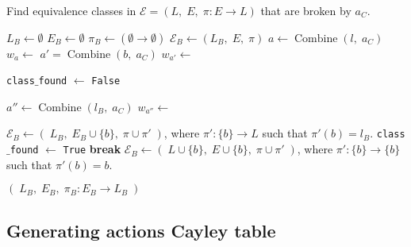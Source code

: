 \begin{algorithm}[H]
	\caption{
		Find equivalence classes in $\mathcal{E} = (L, \; E, \; \pi: E \to L)$ that are broken by $a_{C}$.
	}
	\hrulefill
	\begin{algorithmic}[1]
		\State $L_{B} \gets \emptyset$
		\State $E_{B} \gets \emptyset$
		\State $\pi_{B} \gets (\emptyset \to \emptyset)$
		\State $\mathcal{E}_{B} \gets (L_{B}, \; E, \; \pi)$
		\State $a \gets \operatorname{Combine}(l, \; a_{C})$
		\State $w_{a} \gets$ 
		\State $a' = \operatorname{Combine}(b, \; a_{C})$
		\State $w_{a'} \gets$ 

		\Statex {}
		\State \texttt{class$\_$found} $\gets$ \texttt{False}

		\State $a'' \gets \operatorname{Combine}(l_{B}, \; a_{C})$
		\State $w_{a''} \gets$ 

		\Statex {}
		\State $\mathcal{E}_{B} \gets ( \; L_{B}, \; E_{B} \cup \{b\}, \; \pi \cup \pi' \; )$, where $\pi': \{b\} \to L$ such that $\pi'(b) = l_{B}$.
		\State \texttt{class$\_$found} $\gets$ \texttt{True}
		\State \textbf{break}
		\EndIf
		\EndFor
		\Statex {}
		\State $\mathcal{E}_{B} \gets (\; L \cup \{b\}, \; E \cup \{b\}, \; \pi \cup \pi' \;)$, where $\pi': \{b\} \to \{b\}$ such that $\pi'(b) = b$.
		\EndIf
		\EndIf
		\EndFor
		\EndFor

		\State \Return $( \; L_{B}, \; E_{B}, \; \pi_{B}: E_{B} \to L_{B} \; )$
		\EndProcedure
	\end{algorithmic}
\end{algorithm}

\subsection{Generating actions Cayley table}

